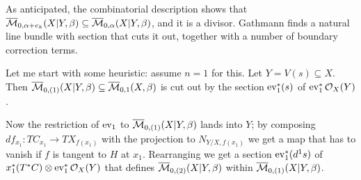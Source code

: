 As anticipated, the combinatorial description shows that $\overline{\mathcal{M}}_{0,\alpha+e_k}(X|Y,\beta)\subseteq \overline{\mathcal{M}}_{0,\alpha}(X|Y,\beta)$, and it is a divisor. Gathmann finds a natural line bundle with section that cuts it out, together with a number of boundary correction terms.

Let me start with some heuristic: assume $n=1$ for this. Let $Y=V(s)\subseteq X$. Then $\overline{\mathcal{M}}_{0,(1)}(X|Y,\beta)\subseteq \overline{\mathcal{M}}_{0,1}(X,\beta)$ is cut out by the section $\operatorname{ev}_1^*(s)$ of $\operatorname{ev}_1^*\mathcal{O}_X(Y)$.

Now the restriction of $\operatorname{ev}_1$ to $\overline{\mathcal{M}}_{0,(1)}(X|Y,\beta)$ lands into $Y$; by composing $df_{x_1}\colon TC_{x_1}\to TX_{f(x_1)}$ with the projection to $N_{Y/X,f(x_1)}$ we get a map that has to vanish if $f$ is tangent to $H$ at $x_1$. Rearranging we get a section $\operatorname{ev}_1^*(d^1s)$ of $x_1^*(T^*C)\otimes\operatorname{ev}_1^*\mathcal{O}_X(Y)$ that defines $\overline{\mathcal{M}}_{0,(2)}(X|Y,\beta)$ within $\overline{\mathcal{M}}_{0,(1)}(X|Y,\beta)$.

